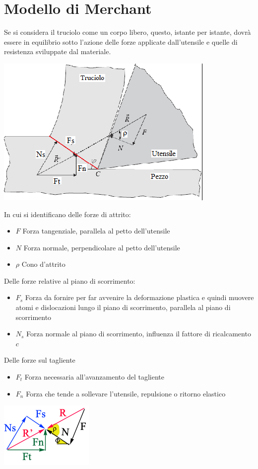 \documentclass[a4paper, 15pt]{article}
\newcommand{\compresslist}{ %
			\setlength{\itemsep}{1pt}
			\setlength{\parskip}{0pt}
			\setlength{\parsep}{0pt}
		}
\begin{document}
	\section{Modello di Merchant}
	Se si considera il truciolo come un corpo libero, questo, istante per istante, dovrà
	essere in equilibrio sotto l'azione delle forze applicate dall'utensile e quelle di resistenza sviluppate dal materiale.
\begin{center}
	\includegraphics[width=0.5\linewidth]{figures/asp8}
\end{center}
	In cui si identificano delle forze di attrito:
	\begin{itemize}\compresslist
 	\item $F$ Forza tangenziale, parallela al petto dell'utensile 
 	\item $N$ Forza normale, perpendicolare al petto dell'utensile 
 	\item $\rho$ Cono d'attrito
 	\end{itemize}
 	Delle forze relative al piano di scorrimento:
 	\begin{itemize}\compresslist
 		\item $F_s$ Forza da fornire per far avvenire la deformazione plastica e quindi muovere atomi e dislocazioni lungo il piano di scorrimento, parallela al piano di scorrimento
 		\item $N_s$ Forza normale al piano di scorrimento, influenza il fattore di ricalcamento $c$
 	\end{itemize}
 	Delle forze sul tagliente
 	\begin{itemize}\compresslist
 		\item $F_t$ Forza necessaria all'avanzamento del tagliente 
 		\item $F_n$ Forza che tende a sollevare l'utensile, repulsione o ritorno elastico
 	\end{itemize}
	\begin{center}
		\includegraphics[width=0.5\linewidth]{figures/asp8.1}
	\end{center}
\end{document}
